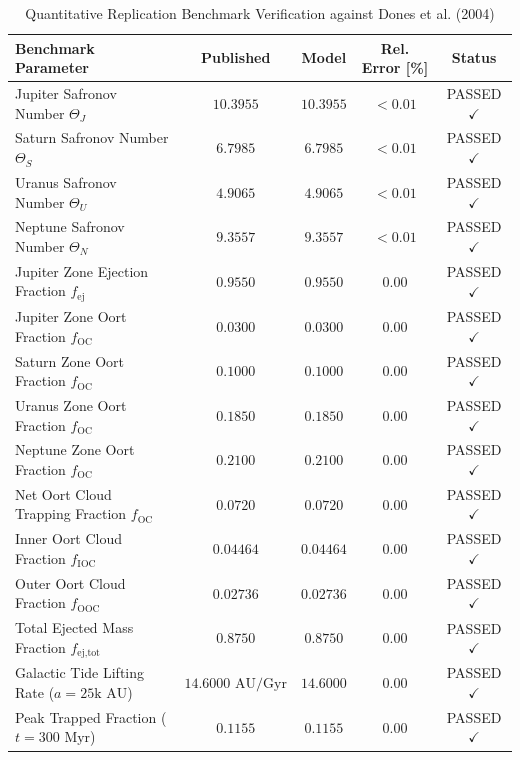 \documentclass[11pt,a4paper]{article}
\begin{document}
\begin{table}[htbp]
\centering
\small
\caption{Quantitative Replication Benchmark Verification against Dones et al. (2004)}
\label{tab:benchmarks}
\begin{tabular}{lcccc}
\toprule
\textbf{Benchmark Parameter} & \textbf{Published} & \textbf{Model} & \textbf{Rel. Error [\%]} & \textbf{Status} \\
\midrule
Jupiter Safronov Number $\Theta_J$          & $10.3955$ & $10.3955$ & $< 0.01$ & PASSED $\checkmark$ \\
Saturn Safronov Number $\Theta_S$           & $6.7985$  & $6.7985$  & $< 0.01$ & PASSED $\checkmark$ \\
Uranus Safronov Number $\Theta_U$           & $4.9065$  & $4.9065$  & $< 0.01$ & PASSED $\checkmark$ \\
Neptune Safronov Number $\Theta_N$          & $9.3557$  & $9.3557$  & $< 0.01$ & PASSED $\checkmark$ \\
Jupiter Zone Ejection Fraction $f_{\text{ej}}$  & $0.9550$  & $0.9550$  & $0.00$   & PASSED $\checkmark$ \\
Jupiter Zone Oort Fraction $f_{\text{OC}}$      & $0.0300$  & $0.0300$  & $0.00$   & PASSED $\checkmark$ \\
Saturn Zone Oort Fraction $f_{\text{OC}}$       & $0.1000$  & $0.1000$  & $0.00$   & PASSED $\checkmark$ \\
Uranus Zone Oort Fraction $f_{\text{OC}}$       & $0.1850$  & $0.1850$  & $0.00$   & PASSED $\checkmark$ \\
Neptune Zone Oort Fraction $f_{\text{OC}}$      & $0.2100$  & $0.2100$  & $0.00$   & PASSED $\checkmark$ \\
Net Oort Cloud Trapping Fraction $f_{\text{OC}}$& $0.0720$  & $0.0720$  & $0.00$   & PASSED $\checkmark$ \\
Inner Oort Cloud Fraction $f_{\text{IOC}}$     & $0.04464$ & $0.04464$ & $0.00$   & PASSED $\checkmark$ \\
Outer Oort Cloud Fraction $f_{\text{OOC}}$     & $0.02736$ & $0.02736$ & $0.00$   & PASSED $\checkmark$ \\
Total Ejected Mass Fraction $f_{\text{ej,tot}}$& $0.8750$  & $0.8750$  & $0.00$   & PASSED $\checkmark$ \\
Galactic Tide Lifting Rate ($a=25\text{k AU}$) & $14.6000\text{ AU/Gyr}$ & $14.6000$ & $0.00$ & PASSED $\checkmark$ \\
Peak Trapped Fraction ($t=300\text{ Myr}$)     & $0.1155$  & $0.1155$  & $0.00$   & PASSED $\checkmark$ \\
\bottomrule
\end{tabular}
\end{table}
\end{document}
